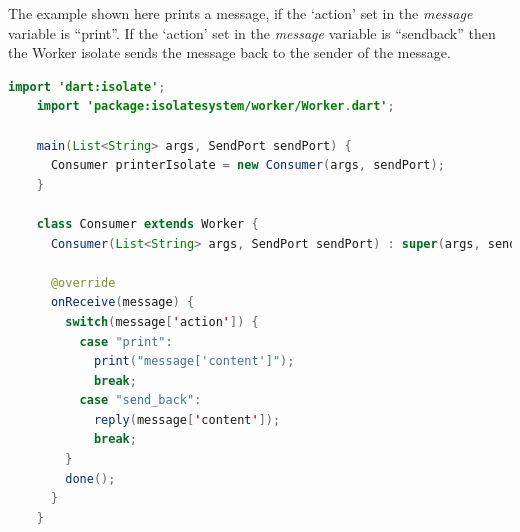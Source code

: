   The example shown here prints a message, if the ‘action’
 set in the \emph{message} variable is “print”. If the ‘action’ set in the \emph{message} variable is “send\textunderscore{}back” then the Worker isolate sends the message back to the sender of the message.

\begin{lstlisting}[language=java,firstnumber=1, caption=A sample Worker isolate that can be deployed in the framework, label=lst:sampleWorker]
    import 'dart:isolate';
    import 'package:isolatesystem/worker/Worker.dart';

    main(List<String> args, SendPort sendPort) {
      Consumer printerIsolate = new Consumer(args, sendPort);
    }

    class Consumer extends Worker {
      Consumer(List<String> args, SendPort sendPort) : super(args, sendPort);

      @override
      onReceive(message) {
        switch(message['action']) {
          case "print":
            print("message['content']");
            break;
          case "send_back":
            reply(message['content']);
            break;
        }
        done();
      }
    }

\end{lstlisting}
